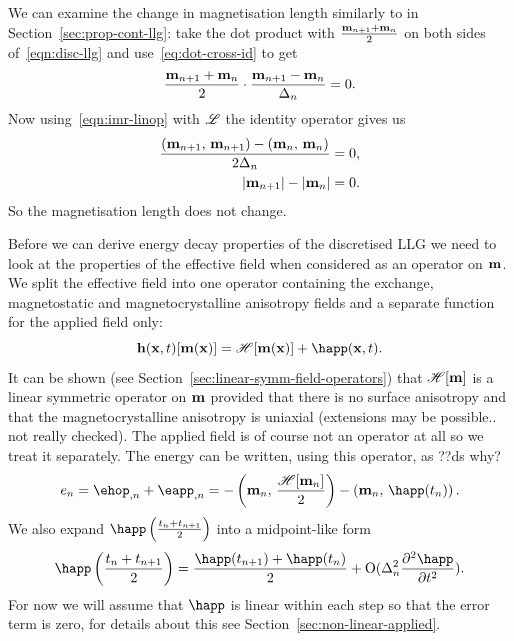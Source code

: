We can examine the change in magnetisation length similarly to in Section~\ref{sec:prop-cont-llg}: take the dot product with $\frac{\mathbf{m}_{n+1} + \mathbf{m}_n}{2}$ on both sides of~\eqref{eqn:disc-llg} and use~\eqref{eq:dot-cross-id} to get
\begin{equation}
  \frac{\mathbf{m}_{n+1} + \mathbf{m}_n}{2} \cdot \frac{\mathbf{m}_{n+1} - \mathbf{m}_n}{\Delta_{n}} = 0.
\end{equation}
Now using~\eqref{eqn:imr-linop} with $\mathscr{L}$ the identity operator gives us
\begin{equation}
  \begin{aligned}
    \frac{\left(\mathbf{m}_{n+1},\, \mathbf{m}_{n+1} \right) - \left(\mathbf{m}_n,\, \mathbf{m}_n \right) }{2 \Delta_{n}} &= 0, \\
    \lvert \mathbf{m}_{n+1} \rvert - \lvert \mathbf{m}_n \rvert &= 0.
  \end{aligned}
\end{equation}
So the magnetisation length does not change.

Before we can derive energy decay properties of the discretised LLG we need to look at the properties of the effective field when considered as an operator on $\mathbf{m}$.
We split the effective field into one operator containing the exchange, magnetostatic and magnetocrystalline anisotropy fields and a separate function for the applied field only:
\begin{equation}
  \label{eq:hop}
  \hv(\xv, t)[\mv(\xv)] = \hop [\mv(\xv)] + \happ(\xv, t).
\end{equation}
It can be shown (see Section~\ref{sec:linear-symm-field-operators}) that $\mathscr{H}[\mathbf{m}]$ is a linear symmetric operator on $\mathbf{m}$ provided that there is no surface anisotropy and that the magnetocrystalline anisotropy is uniaxial (extensions may be possible.. not really checked).
The applied field is of course not an operator at all so we treat it separately. The energy can be written, using this operator, as ??ds why?
\begin{equation}
  \label{eq:energy-hop}
  \e_n = \ehop_{,n} + \eapp_{,n} = - \ip{\mv_n}{\frac{\hop[\mv_n]}{2}} - \ip{\mv_n}{\happ(t_n)}.
\end{equation}
We also expand $\mphapp$ into a midpoint-like form
\begin{equation}
  \mphapp = \frac{\happ(t_{n+1}) + \happ(t_n)}{2} + \order{\dtn^2 \spd{\happ}{t}}.
  \label{eq:happ-midpoint}
\end{equation}
For now we will assume that $\happ$ is linear within each step so that the error term is zero, for details about this see Section~\ref{sec:non-linear-applied}.

